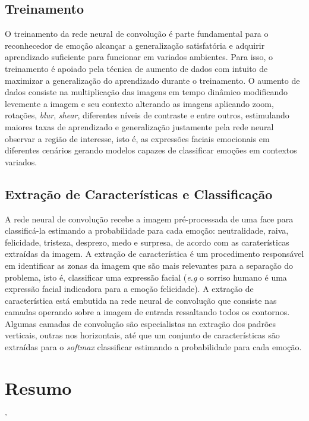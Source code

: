 \subsection{Treinamento}
O treinamento da rede neural de convolução é parte fundamental para o reconhecedor de emoção alcançar a generalização satisfatória e adquirir aprendizado suficiente para funcionar em variados ambientes. Para isso, o treinamento é apoiado pela técnica de aumento de dados com intuito de maximizar a generalização do aprendizado durante o treinamento. O aumento de dados consiste na multiplicação das imagens em tempo dinâmico modificando levemente a imagem e seu contexto alterando as imagens aplicando zoom, rotações, \textit{blur}, \textit{shear}, diferentes níveis de contraste e entre outros, estimulando maiores taxas de aprendizado e generalização justamente pela rede neural observar a região de interesse, isto é, as expressões faciais emocionais em diferentes cenários gerando modelos capazes de classificar emoções em contextos variados. 

\subsection{Extração de Características e Classificação}
A rede neural de convolução recebe a imagem pré-processada de uma face para classificá-la estimando a probabilidade para cada emoção: neutralidade, raiva, felicidade, tristeza, desprezo, medo e surpresa, de acordo com as caraterísticas extraídas da imagem.  A extração de característica é um procedimento responsável em identificar as zonas da imagem que são mais relevantes para a separação do problema, isto é, classificar uma expressão facial (\textit{e.g} o sorriso humano é uma expressão facial indicadora para a emoção felicidade). A extração de característica está embutida na rede neural de convolução que consiste nas camadas operando sobre a imagem de entrada ressaltando todos os contornos. Algumas camadas de convolução são especialistas na extração dos padrões verticais, outras nos horizontais, até que um conjunto de características são extraídas para o \textit{softmax} classificar estimando a probabilidade para cada emoção.



     

\section{Resumo}\label{sec:considfi}
'%
